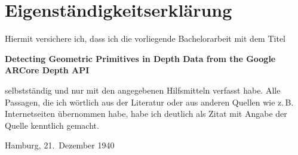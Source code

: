 
\printbibliography

\appendix

%
%

\clearpage

\thispagestyle{empty}

\section*{Eigenständigkeitserklärung}

Hiermit versichere ich, dass ich die vorliegende Bachelorarbeit mit dem Titel
\begin{center}
    \textbf{
        Detecting Geometric Primitives
        in Depth Data from the
        Google ARCore Depth API
    }
\end{center}
selbstständig und nur mit den angegebenen Hilfsmitteln verfasst habe. Alle
Passagen, die ich wörtlich aus der Literatur oder aus anderen Quellen wie
z.\,B. Internetseiten übernommen habe, habe ich deutlich als Zitat mit Angabe
der Quelle kenntlich gemacht.

%
\vspace{2cm}
%

Hamburg, 21.\ Dezember 1940
